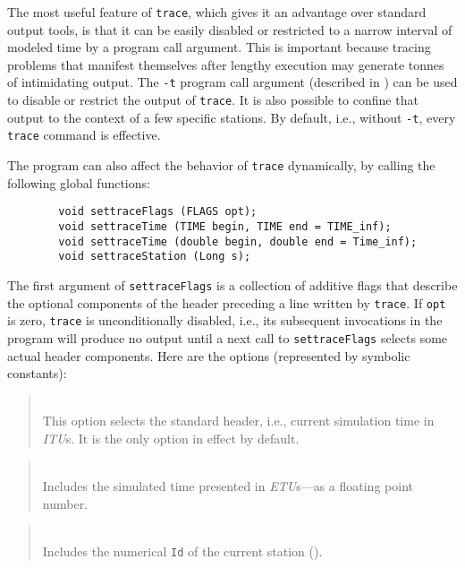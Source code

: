 The most useful feature of {\tt trace}, which gives it an advantage over
standard output tools, is that it can be easily disabled or restricted
to a narrow interval of modeled time by a program call argument.
This is important because tracing problems that manifest themselves after
lengthy execution may generate tonnes of intimidating output.
The {\tt -t} program call argument (described in )
can be used to disable or restrict the output of {\tt trace}.
It is also possible to confine that output to the context of a few
specific stations.
By default, i.e., without {\tt -t}, every {\tt trace} command is
effective.

The program can also affect the behavior of {\tt trace} dynamically, by
calling the following global functions:

\begin{verbatim}
        void settraceFlags (FLAGS opt);
        void settraceTime (TIME begin, TIME end = TIME_inf);
        void settraceTime (double begin, double end = Time_inf);
        void settraceStation (Long s);
\end{verbatim}

\noindent
The first argument of {\tt settraceFlags} is a collection of additive
flags that describe
the optional components of the header preceding a line written by {\tt trace}.
If {\tt opt} is zero, {\tt trace} is unconditionally
disabled, i.e., its subsequent
invocations in the program will produce no output until a next call to
{\tt settraceFlags} selects some actual header components.
Here are the options (represented by symbolic constants):

\begin{quote}
\noindent{}\\ \hspace{0in}
This option selects the standard header, i.e., current simulation time
in {\em ITU\/}s.
It is the only option in effect by default.
\end{quote}

\begin{quote}
\noindent{}\\ \hspace{0in}
Includes the simulated time presented in {\em ETU\/}s---as a floating point
number.
\end{quote}

\begin{quote}
\noindent{}\\ \hspace{0in}
Includes the numerical {\tt Id} of the current station ().
\end{quote}

